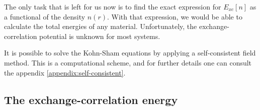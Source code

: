 The only task that is left for us now is to find the exact expression for $E_{xc}[n]$ as a functional of the density $n(r)$. With that expression, we would be able to calculate the total energies of any material. %
Unfortunately, the exchange-correlation potential is unknown for most systems.

It is possible to solve the Kohn-Sham equations by applying a self-consistent field method. This is a computational scheme, and for further details one can consult the appendix \autoref{appendix:self-consistent}.




\subsection{The exchange-correlation energy}


